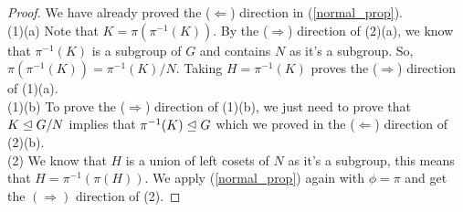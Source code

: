 \begin{proof}
    We have already proved the ($\Leftarrow$) direction in 
    (\ref{normal_prop}).
    \\[\baselineskip]
    (1)(a)
    Note that $K = \pi(\pi^{-1}(K))$. By the
    ($\Rightarrow$) direction of (2)(a), we know that
    $\pi^{-1}(K)$ is a subgroup of $G$ and contains
    $N$ as it's a subgroup. So, \linebreak
    $\pi(\pi^{-1}(K)) = \pi^{-1}(K) / N$.
    Taking $H = \pi^{-1}(K)$ proves the ($\Rightarrow$) direction of (1)(a).
    \\[\baselineskip]
    (1)(b) 
    To prove the ($\Rightarrow$) direction of (1)(b), we just need to
    prove that $K \trianglelefteq G/N$ implies that $\pi^{-1}(K) \trianglelefteq G$ which
    we proved in the ($\Leftarrow$) direction of (2)(b).
    \\[\baselineskip]
    (2)
    We know that $H$ is a union of left cosets of $N$ as it's a subgroup, 
    this means that $H = \pi^{-1}(\pi(H))$. We apply (\ref{normal_prop}) 
    again with $\phi = \pi$ and get the $(\Rightarrow)$ direction of
    (2).
\end{proof}
